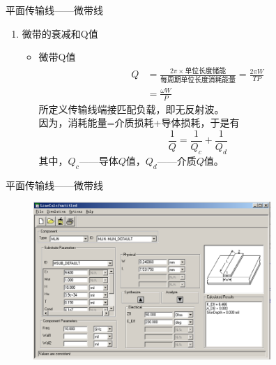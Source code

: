 \begin{frame}{平面传输线——微带线}
    \begin{enumerate}
        \resume
        \item 微带的衰减和Q值
        \begin{itemize}
            \item 微带Q值\\
            \begin{align*}
                Q&=\frac{2\pi\times\text{单位长度储能}}{\text{每周期单位长度消耗能量}}=\frac{2\pi W}{TP}\\
                &=\frac{\omega W}{P}
            \end{align*}
            所定义传输线端接匹配负载，即无反射波。\\
            因为，消耗能量=介质损耗+导体损耗，于是有
            $$\frac{1}{Q}=\frac{1}{Q_c}+\frac{1}{Q_d}$$
            其中，$Q_c$——导体$Q$值，$Q_d$——介质$Q$值。
        \end{itemize}
    \end{enumerate}
\end{frame}

\begin{frame}{平面传输线——微带线}
    \begin{figure}
        \includegraphics[width=9cm]{Cha6//fig6-46.png}
    \end{figure}
\end{frame}
